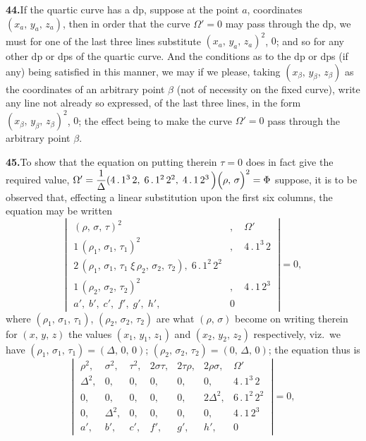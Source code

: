 \documentclass[11pt,a4paper]{article}
\theoremstyle{plain}
\theoremstyle{definition}
\theoremstyle{remark}
\begin{document}
\medskip\noindent\textbf{44.}\quad If the quartic curve has a dp, suppose at the point $a$, coordinates $(x_a,\,y_a,\,z_a)$, then in order that the curve $\Omega' = 0$ may pass through the dp, we must for one of the last three lines substitute $(x_a,\,y_a,\,z_a)^2$, $0$; and so for any other dp or dps of the quartic curve. And the conditions as to the dp or dps (if any) being satisfied in this manner, we may if we please, taking $(x_\beta,\,y_\beta,\,z_\beta)$ as the coordinates of an arbitrary point $\beta$ (not of necessity on the fixed curve), write any line not already so expressed, of the last three lines, in the form $(x_\beta,\,y_\beta,\,z_\beta)^2$, $0$; the effect being to make the curve $\Omega' = 0$ pass through the arbitrary point $\beta$.

\medskip\noindent\textbf{45.}\quad To show that the equation on putting therein $\tau = 0$ does in fact give the required value, $\Omega' = \dfrac{1}{\Delta}(4\,.\,1^3\,2,\;6\,.\,1^2\,2^2,\;4\,.\,1\,2^{3}\,\Bigl)\Bigl(\rho,\,\sigma\Bigr)^2 = \Phi$ suppose, it is to be observed that, effecting a linear substitution upon the first six columns, the equation may be written
\[
\left|\;\begin{array}{cc}
(\rho,\,\sigma,\,\tau)^{2}     & ,\quad \Omega'\\
1\,(\rho_1,\,\sigma_1,\,\tau_1)^{2} & ,\quad 4\,.\,1^{3}\,2\\
2\,(\rho_1,\,\sigma_1,\,\tau_1\;\xi\,\rho_2,\,\sigma_2,\,\tau_2),\;6\,.\,1^{2}\,2^{2}\\
1\,(\rho_2,\,\sigma_2,\,\tau_2)^{2} & ,\quad 4\,.\,1\,2^{3}\\
a',\;b',\;c',\;f',\;g',\;h', & 0
\end{array}\;\right| = 0,
\]
where $(\rho_1,\,\sigma_1,\,\tau_1)$, $(\rho_2,\,\sigma_2,\,\tau_2)$ are what $(\rho,\,\sigma)$ become on writing therein for $(x,\,y,\,z)$ the values $(x_1,\,y_1,\,z_1)$ and $(x_2,\,y_2,\,z_2)$ respectively, viz.\ we have $(\rho_1,\,\sigma_1,\,\tau_1) = (\Delta,\,0,\,0)$; $(\rho_2,\,\sigma_2,\,\tau_2) = (0,\,\Delta,\,0)$; the equation thus is
\[
\left|\;\begin{array}{ccccccc}
\rho^{2},  & \sigma^{2}, & \tau^{2}, & 2\sigma\tau, & 2\tau\rho, & 2\rho\sigma, & \Omega'\\
\Delta^{2}, & 0,         & 0,        & 0,           & 0,         & 0,           & 4\,.\,1^{3}\,2\\
0,         & 0,          & 0,        & 0,           & 0,         & 2\Delta^{2}, & 6\,.\,1^{2}\,2^{2}\\
0,         & \Delta^{2}, & 0,        & 0,           & 0,         & 0,           & 4\,.\,1\,2^{3}\\
a',        & b',         & c',       & f',          & g',        & h',          & 0
\end{array}\;\right| = 0,
\]
\end{document}
